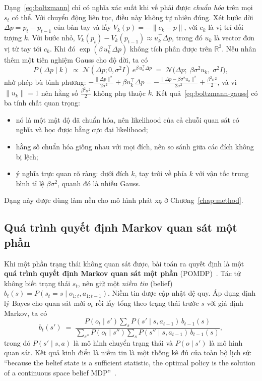 Dạng~\eqref{eq:boltzmann} chỉ có nghĩa xác suất khi vế phải được \emph{chuẩn hóa} trên mọi $s_t$ có thể. Với chuyển động liên tục, điều này không tự nhiên đúng. Xét bước dời $\Delta p=p_t-p_{t-1}$ của bàn tay và lấy $V_k(p)=-\|c_k-p\|$, với $c_k$ là vị trí đối tượng $k$. Với bước nhỏ, $V_k(p_t)-V_k(p_{t-1})\approx u_k^\top\Delta p$, trong đó $u_k$ là vector đơn vị từ tay tới $c_k$. Khi đó $\exp(\beta\,u_k^\top\Delta p)$ không tích phân được trên $\mathbb{R}^3$. Nếu nhân thêm một tiên nghiệm Gauss cho độ dời, ta có
\begin{equation}
  P(\Delta p\mid k)\;\propto\;\mathcal{N}(\Delta p;0,\sigma^2 I)\,e^{\beta\,u_k^\top\Delta p}
  \;=\;\mathcal{N}\big(\Delta p;\;\beta\sigma^2u_k,\;\sigma^2 I\big),
  \label{eq:boltzmann-gauss}
\end{equation}
nhờ phép bù bình phương: $-\frac{\|\Delta p\|^2}{2\sigma^2}+\beta u_k^\top\Delta p=-\frac{\|\Delta p-\beta\sigma^2u_k\|^2}{2\sigma^2}+\frac{\beta^2\sigma^2}{2}$, và vì $\|u_k\|=1$ nên hằng số $\frac{\beta^2\sigma^2}{2}$ không phụ thuộc $k$. Kết quả~\eqref{eq:boltzmann-gauss} có ba tính chất quan trọng:
\begin{itemize}
  \item nó là một mật độ đã chuẩn hóa, nên likelihood của cả chuỗi quan sát có nghĩa và học được bằng cực đại likelihood;
  \item hằng số chuẩn hóa giống nhau với mọi đích, nên so sánh giữa các đích không bị lệch;
  \item ý nghĩa trực quan rõ ràng: dưới đích $k$, tay trôi về phía $k$ với vận tốc trung bình tỉ lệ $\beta\sigma^2$, quanh đó là nhiễu Gauss.
\end{itemize}
Dạng này được dùng làm nền cho mô hình phát xạ ở Chương~\ref{chap:method}.

\subsection{Quá trình quyết định Markov quan sát một phần}

Khi một phần trạng thái không quan sát được, bài toán ra quyết định là một \textbf{quá trình quyết định Markov quan sát một phần} (POMDP)~\cite{astrom1965optimal,kaelbling1998planning}. Tác tử không biết trạng thái $s_t$, nên giữ một \emph{niềm tin} (belief) $b_t(s)=P(s_t=s\mid o_{1:t},a_{1:t-1})$. Niềm tin được cập nhật đệ quy. Áp dụng định lý Bayes cho quan sát mới $o_t$ rồi lấy tổng theo trạng thái trước $s$ với giả định Markov, ta có
\begin{equation}
  b_{t}(s')\;=\;\frac{P(o_{t}\mid s')\sum_{s}P(s'\mid s,a_{t-1})\,b_{t-1}(s)}{\sum_{s''}P(o_{t}\mid s'')\sum_{s}P(s''\mid s,a_{t-1})\,b_{t-1}(s)},
  \label{eq:belief-update}
\end{equation}
trong đó $P(s'\mid s,a)$ là mô hình chuyển trạng thái và $P(o\mid s')$ là mô hình quan sát. Kết quả kinh điển là niềm tin là một thống kê đủ của toàn bộ lịch sử: ``because the belief state is a sufficient statistic, the optimal policy is the solution of a continuous space belief MDP''~\cite[§3.4]{kaelbling1998planning}.

